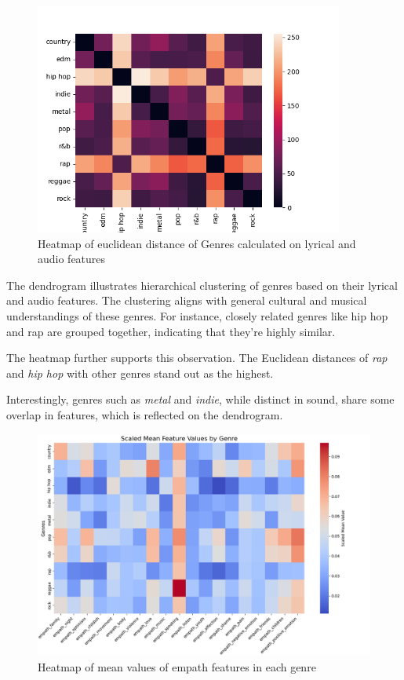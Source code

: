 \begin{center}
\begin{figure}[H]
  \centering
  \includegraphics[width=4in]{img/genres_similarity_heatmap.png}
  \caption{Heatmap of euclidean distance of Genres calculated on lyrical and audio features}
  \label{Figure:dendrogram_spotify_features}
\end{figure}
\end{center}

The dendrogram illustrates hierarchical clustering of genres based on their
lyrical and  audio features. The clustering aligns with general cultural and
musical understandings of  these genres. For instance, closely related  genres
like hip hop and rap are grouped  together, indicating that they're highly
similar.

The heatmap further supports this observation. The Euclidean distances of
\textit{rap} and \textit{hip hop} with other genres stand  out as the highest.

Interestingly, genres such as \textit{metal} and \textit{indie}, while distinct
in sound, share some overlap in features, which is reflected on the dendrogram.

\begin{center}
\begin{figure}[H]
  \centering
  \includegraphics[width=6in]{img/heatmap_of_empath.png}
  \caption{Heatmap of mean values of empath features in each genre}
  \label{Figure:dendrogram_spotify_features}
\end{figure}
\end{center}


